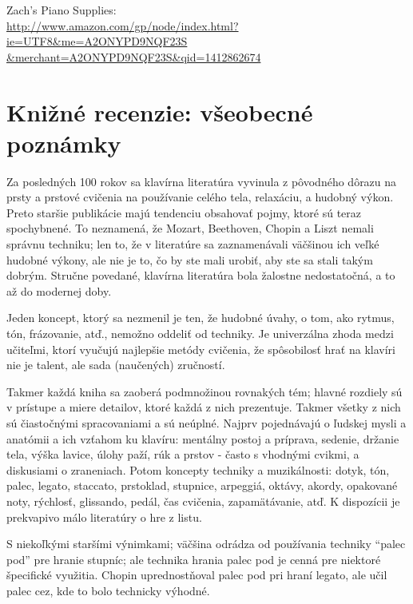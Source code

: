 \documentclass[11pt,a4paper]{book}
\begin{document}
Zach's Piano Supplies:\\
\href{http://www.amazon.com/gp/node/index.html?ie=UTF8\&me=A2ONYPD9NQF23S\&merchant=A2ONYPD9NQF23S\&qid=1412862674}{
http://www.amazon.com/gp/node/index.html?ie=UTF8\&me=A2ONYPD9NQF23S\\\&merchant=A2ONYPD9NQF23S\&qid=1412862674}
\chapter*{Knižné recenzie: všeobecné poznámky}\label{s:book-reviews}
Za posledných 100 rokov sa klavírna literatúra vyvinula z pôvodného dôrazu na prsty a prstové cvičenia na používanie celého tela, relaxáciu, a hudobný výkon. Preto staršie publikácie majú tendenciu obsahovať pojmy, ktoré sú teraz spochybnené. To neznamená, že Mozart, Beethoven, Chopin a Liszt nemali správnu techniku; len to, že v literatúre sa zaznamenávali väčšinou ich veľké hudobné výkony, ale nie je to, čo by ste mali urobiť, aby ste sa stali takým dobrým. Stručne povedané, klavírna literatúra bola žalostne nedostatočná, a to až do modernej doby. 

Jeden koncept, ktorý sa nezmenil je ten, že hudobné úvahy, o tom, ako rytmus, tón, frázovanie, atď., nemožno oddeliť od techniky. Je univerzálna zhoda medzi učiteľmi, ktorí vyučujú najlepšie metódy cvičenia, že spôsobilosť hrať na klavíri nie je talent, ale sada (naučených) zručností. 

Takmer každá kniha sa zaoberá podmnožinou rovnakých tém; hlavné rozdiely sú v prístupe a miere detailov, ktoré každá z nich prezentuje. Takmer všetky z nich sú čiastočnými spracovaniami a sú  neúplné. Najprv pojednávajú o ľudskej mysli a anatómii a ich vzťahom ku klavíru: mentálny postoj a príprava, sedenie, držanie tela, výška lavice, úlohy paží, rúk a prstov - často s vhodnými cvikmi, a diskusiami o zraneniach. Potom koncepty techniky a muzikálnosti: dotyk, tón, palec, legato, staccato, prstoklad, stupnice, arpeggiá, oktávy, akordy, opakované noty, rýchlosť, glissando, pedál, čas cvičenia, zapamätávanie, atď. K dispozícii je prekvapivo málo literatúry o hre z listu. 

S niekoľkými staršími výnimkami; väčšina odrádza od používania techniky “palec pod” pre hranie stupníc; ale technika hrania palec pod je cenná pre niektoré špecifické využitia. Chopin uprednostňoval palec pod pri hraní legato, ale učil palec cez, kde to bolo technicky výhodné. 
\end{document}
